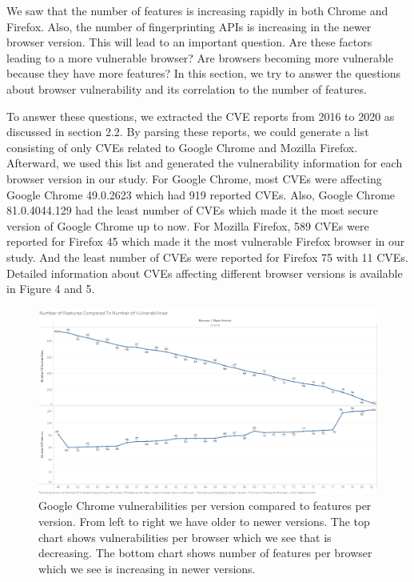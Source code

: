 We saw that the number of features is increasing rapidly in both Chrome and Firefox. Also, the number of fingerprinting APIs is increasing in the newer browser version. This will lead to an important question. Are these factors leading to a more vulnerable browser? Are browsers becoming more vulnerable because they have more features? In this section, we try to answer the questions about browser vulnerability and its correlation to the number of features.

To answer these questions, we extracted the CVE reports from 2016 to 2020 as discussed in section 2.2. By parsing these reports, we could generate a list consisting of only CVEs related to Google Chrome and Mozilla Firefox. Afterward, we used this list and generated the vulnerability information for each browser version in our study. For Google Chrome, most CVEs were affecting Google Chrome 49.0.2623 which had 919 reported CVEs. Also, Google Chrome 81.0.4044.129 had the least number of CVEs which made it the most secure version of Google Chrome up to now. For Mozilla Firefox, 589 CVEs were reported for Firefox 45 which made it the most vulnerable Firefox browser in our study. And the least number of CVEs were reported for Firefox 75 with 11 CVEs. Detailed information about CVEs affecting different browser versions is available in Figure 4 and 5.

\begin{figure}[ht]
    \centering
    \includegraphics[width=\columnwidth]{figures/Chrome-feature-vulnerability.png}
    \caption{Google Chrome vulnerabilities per version compared to features per version. From left to right we have older to newer versions. The top chart shows vulnerabilities per browser which we see that is decreasing. The bottom chart shows number of features per browser which we see is increasing in newer versions.}
    \label{fig:chrome-vuln}
\end{figure}



